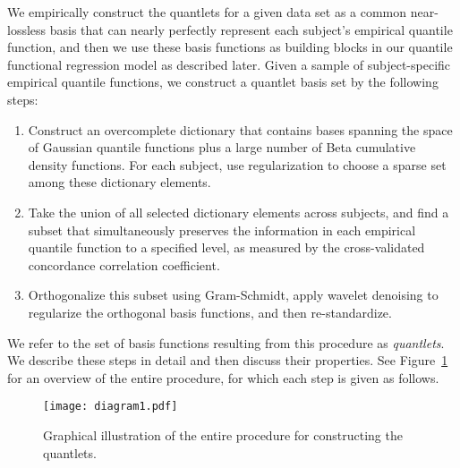 \documentclass[11pt]{article}
\begin{document}
We empirically construct the quantlets for a given data set as a common near-lossless basis that can nearly perfectly represent each subject's empirical quantile function, and then we use these basis functions as building blocks in our quantile functional regression model as described later.  Given a sample of subject-specific empirical quantile functions, we construct a quantlet basis set by the following steps:
\begin{enumerate}
\item Construct an overcomplete dictionary that contains bases spanning the space of Gaussian quantile functions plus a large number of Beta cumulative density functions.  For each subject, use regularization to choose a sparse set among these dictionary elements.  

\item Take the union of all selected dictionary elements across subjects, and find a subset that simultaneously preserves the information in each empirical quantile function to a specified level, as measured by the cross-validated concordance correlation coefficient.

\item Orthogonalize this subset using Gram-Schmidt, apply wavelet denoising to regularize the orthogonal basis functions, and then re-standardize.
\end{enumerate}
We refer to the set of basis functions resulting from this procedure as \textit{quantlets}.   
We describe these steps in detail and then discuss their properties. 
See Figure~\ref{diagram} for an overview of the entire procedure, for which each step is given as follows.
 \begin{figure}[!htb]
\centering
\caption{Graphical illustration of the entire procedure for constructing the quantlets.
  \label{diagram}}
\texttt{[image: diagram1.pdf]}
\vspace{0.5cm} 
\end{figure}
\end{document}
